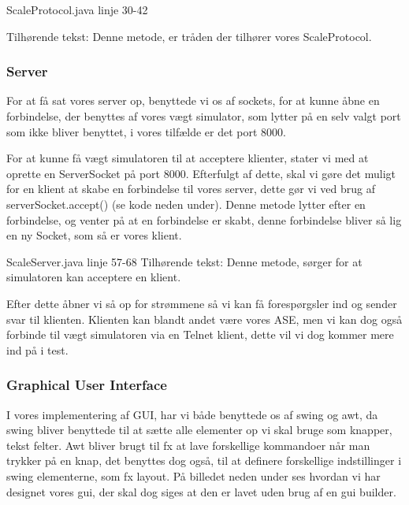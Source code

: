\documentclass[a4paper]{article}
\begin{document}
\begin{center}
ScaleProtocol.java linje 30-42

Tilhørende tekst: Denne metode, er tråden der tilhører vores ScaleProtocol.
\end{center}


\subsubsection{Server} %

For at få sat vores server op, benyttede vi os af sockets, for at kunne åbne en forbindelse, der benyttes af vores vægt simulator, som lytter på en selv valgt port som ikke bliver benyttet, i vores tilfælde er det port 8000.

For at kunne få vægt simulatoren til at acceptere klienter, stater vi med at oprette en ServerSocket på port 8000. Efterfulgt af dette, skal vi gøre det muligt for en klient at skabe en forbindelse til vores server, dette gør vi ved brug af serverSocket.accept() (se kode neden under). Denne metode lytter efter en forbindelse, og venter på at en forbindelse er skabt, denne forbindelse bliver så lig en ny Socket, som så er vores klient. 

\begin{center}
ScaleServer.java linje 57-68
Tilhørende tekst: Denne metode, sørger for at simulatoren kan acceptere en klient.
\end{center}

Efter dette åbner vi så op for strømmene så vi kan få forespørgsler ind og sender svar til klienten. Klienten kan blandt andet være vores ASE, men vi kan dog også forbinde til vægt simulatoren via en Telnet klient, dette vil vi dog kommer mere ind på i test.


\subsubsection{Graphical User Interface} %

I vores implementering af GUI, har vi både benyttede os af swing og awt, da swing bliver benyttede til at sætte alle elementer op vi skal bruge som knapper, tekst felter. Awt bliver brugt til fx at lave forskellige kommandoer når man trykker på en knap, det benyttes dog også, til at definere forskellige indstillinger i swing elementerne, som fx layout. På billedet neden under ses hvordan vi har designet vores gui, der skal dog siges at den er lavet uden brug af en gui builder.
\end{document}
